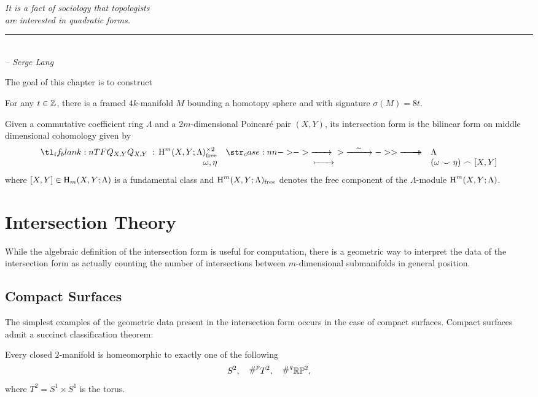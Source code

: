 \begin{flushleft}
	\textsl{It is a fact of sociology that topologists}\\
	\textsl{are interested in quadratic forms.}\\
	\rule[0pt]{17em}{0.5pt}\\
	\textsl{-- Serge Lang}
	\vspace{2em}
\end{flushleft}

The goal of this chapter is to construct

\begin{theorem}\label{thm:signature_8_existence_theorem}
	For any $t\in \mathbb{Z}$, there is a framed $4k$-manifold $M$ bounding a homotopy sphere and with signature $\sigma(M)=8t$.
\end{theorem}

Given a commutative coefficient ring $\Lambda$ and a $2m$-dimensional Poincar\'e pair $(X,Y)$, its intersection form is the bilinear form on middle dimensional cohomology
given by
\[ 
	\lkxfunc{Q_{X,Y}}{\H^m(X,Y; \Lambda)^{\times 2}_{\textrm{free}}}{\Lambda}{\omega, \eta}{(\omega\smile \eta)\frown [X,Y]}
\]
where $[X,Y]\in \operatorname{H}_m(X,Y; \Lambda)$ is a fundamental class and $\operatorname{H}^m(X,Y; \Lambda)_{\textrm{free}}$ denotes the free component of the $\Lambda$-module $\operatorname{H}^m(X,Y;\Lambda)$. 

\section{Intersection Theory}

\pagebreak

While the algebraic definition of the intersection form is useful for computation, there is a geometric way to interpret the data of the intersection form as actually counting the number of intersections between $m$-dimensional submanifolds in general position.

\subsection*{Compact Surfaces}

The simplest examples of the geometric data present in the intersection form occurs in the case of compact surfaces. Compact surfaces admit a succinct classification theorem:
\begin{theorem}
	Every closed $2$-manifold is homeomorphic to exactly one of the following 
	\[
			S^2,\quad \hash^p T^2, \quad \hash^q \RP^2,
	\]
	where $T^2=S^1\times S^1$ is the torus.
\end{theorem}

